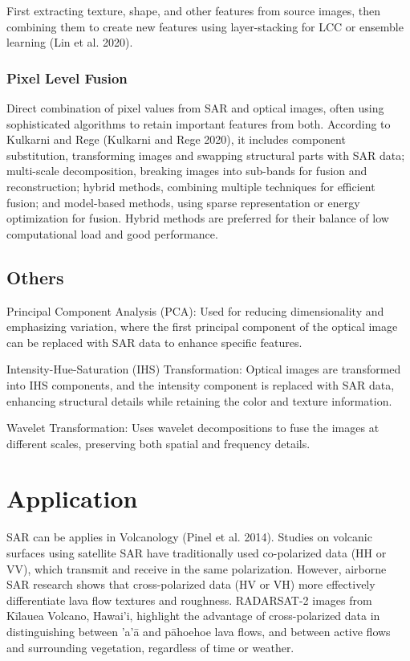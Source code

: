 \documentclass[
  letterpaper,
  DIV=11,
  numbers=noendperiod]{scrreprt}
\begin{document}
First extracting texture, shape, and other features from source images,
then combining them to create new features using layer-stacking for LCC
or ensemble learning (Lin et al. 2020).

\subsubsection{Pixel Level Fusion}\label{pixel-level-fusion}

Direct combination of pixel values from SAR and optical images, often
using sophisticated algorithms to retain important features from both.
According to Kulkarni and Rege (Kulkarni and Rege 2020), it includes
component substitution, transforming images and swapping structural
parts with SAR data; multi-scale decomposition, breaking images into
sub-bands for fusion and reconstruction; hybrid methods, combining
multiple techniques for efficient fusion; and model-based methods, using
sparse representation or energy optimization for fusion. Hybrid methods
are preferred for their balance of low computational load and good
performance.

\subsection{Others}\label{others}

Principal Component Analysis (PCA): Used for reducing dimensionality and
emphasizing variation, where the first principal component of the
optical image can be replaced with SAR data to enhance specific
features.

Intensity-Hue-Saturation (IHS) Transformation: Optical images are
transformed into IHS components, and the intensity component is replaced
with SAR data, enhancing structural details while retaining the color
and texture information.

Wavelet Transformation: Uses wavelet decompositions to fuse the images
at different scales, preserving both spatial and frequency details.

\section{Application}\label{application-7}

SAR can be applies in Volcanology (Pinel et al. 2014). Studies on
volcanic surfaces using satellite SAR have traditionally used
co-polarized data (HH or VV), which transmit and receive in the same
polarization. However, airborne SAR research shows that cross-polarized
data (HV or VH) more effectively differentiate lava flow textures and
roughness. RADARSAT-2 images from Kīlauea Volcano, Hawai'i, highlight
the advantage of cross-polarized data in distinguishing between 'a'ā and
pāhoehoe lava flows, and between active flows and surrounding
vegetation, regardless of time or weather.
\end{document}
